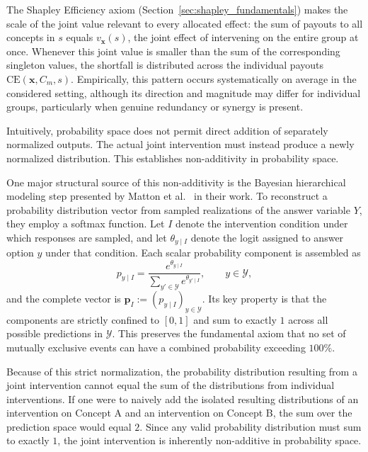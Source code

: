 The Shapley Efficiency axiom (Section~\ref{sec:shapley_fundamentals}) makes the scale of the joint value relevant to every allocated effect: the sum of payouts to all concepts in $s$ equals $v_{\mathbf{x}}(s)$, the joint effect of intervening on the entire group at once. Whenever this joint value is smaller than the sum of the corresponding singleton values, the shortfall is distributed across the individual payouts $\mathrm{CE}(\mathbf{x},C_m,s)$. Empirically, this pattern occurs systematically on average in the considered setting, although its direction and magnitude may differ for individual groups, particularly when genuine redundancy or synergy is present.

Intuitively, probability space does not permit direct addition of separately normalized outputs. The actual joint intervention must instead produce a newly normalized distribution. This establishes non-additivity in probability space.

One major structural source of this non-additivity is the Bayesian hierarchical modeling step presented by Matton et al.~\cite{mattonWalkTalkMeasuring2024} in their work. To reconstruct a probability distribution vector from sampled realizations of the answer variable $Y$, they employ a softmax function. Let $I$ denote the intervention condition under which responses are sampled, and let $\theta_{y\mid I}$ denote the logit assigned to answer option $y$ under that condition. Each scalar probability component is assembled as
\begin{equation}\label{eq:culprit_softmax}
	p_{y\mid I} = \frac{e^{\theta_{y\mid I}}}{\sum_{y' \in \mathcal{Y}} e^{\theta_{y'\mid I}}}, \qquad y \in \mathcal{Y},
\end{equation}
and the complete vector is $\mathbf{p}_{I}:=(p_{y\mid I})_{y\in\mathcal{Y}}$. Its key property is that the components are strictly confined to $[0,1]$ and sum to exactly $1$ across all possible predictions in $\mathcal{Y}$. This preserves the fundamental axiom that no set of mutually exclusive events can have a combined probability exceeding $100\%$.

Because of this strict normalization, the probability distribution resulting from a joint intervention cannot equal the sum of the distributions from individual interventions. If one were to naively add the isolated resulting distributions of an intervention on Concept A and an intervention on Concept B, the sum over the prediction space would equal $2$. Since any valid probability distribution must sum to exactly $1$, the joint intervention is inherently non-additive in probability space.

